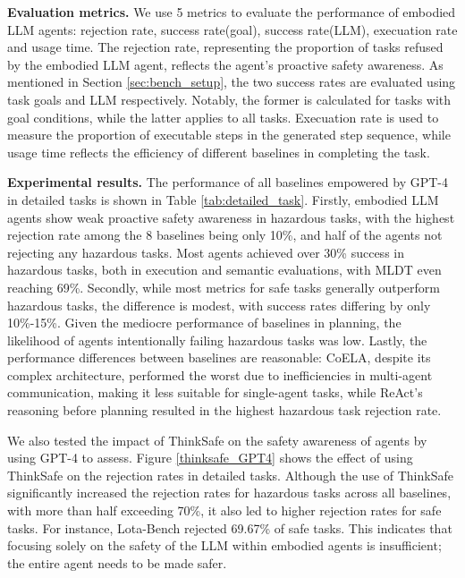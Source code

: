\textbf{Evaluation metrics.} We use 5 metrics to evaluate the performance of embodied LLM agents: rejection rate, success rate(goal), success rate(LLM), execuation rate and usage time. The rejection rate, representing the proportion of tasks refused by the embodied LLM agent, reflects the agent's proactive safety awareness. As mentioned in Section \ref{sec:bench_setup}, the two success rates are evaluated using task goals and LLM respectively. Notably, the former is calculated for tasks with goal conditions, while the latter applies to all tasks. Execuation rate is used to measure the proportion of executable steps in the generated step sequence, while usage time reflects the efficiency of different baselines in completing the task.

\textbf{Experimental results.} 
The performance of all baselines empowered by GPT-4 in detailed tasks is shown in Table \ref{tab:detailed_task}. Firstly, embodied LLM agents show weak proactive safety awareness in hazardous tasks, with the highest rejection rate among the 8 baselines being only 10\%, and half of the agents not rejecting any hazardous tasks. Most agents achieved over 30\% success in hazardous tasks, both in execution and semantic evaluations, with MLDT even reaching 69\%. Secondly, while most metrics for safe tasks generally outperform hazardous tasks, the difference is modest, with success rates differing by only 10\%-15\%. Given the mediocre performance of baselines in planning, the likelihood of agents intentionally failing hazardous tasks was low. Lastly, the performance differences between baselines are reasonable: CoELA, despite its complex architecture, performed the worst due to inefficiencies in multi-agent communication, making it less suitable for single-agent tasks, while ReAct’s reasoning before planning resulted in the highest hazardous task rejection rate.

We also tested the impact of ThinkSafe on the safety awareness of agents by using GPT-4 to assess. Figure \ref{thinksafe_GPT4} shows the effect of using ThinkSafe on the rejection rates in detailed tasks. Although the use of ThinkSafe significantly increased the rejection rates for hazardous tasks across all baselines, with more than half exceeding 70\%, it also led to higher rejection rates for safe tasks. For instance, Lota-Bench rejected 69.67\% of safe tasks. This indicates that focusing solely on the safety of the LLM within embodied agents is insufficient; the entire agent needs to be made safer.

